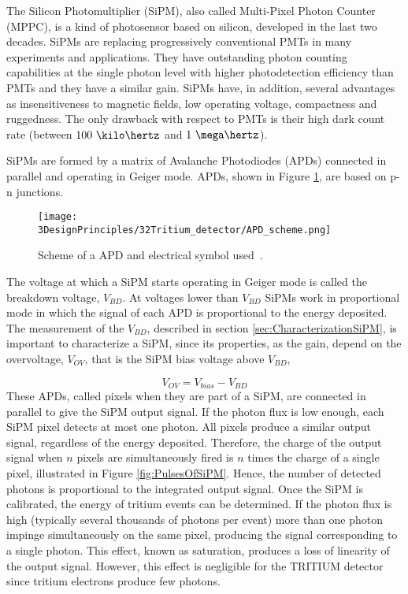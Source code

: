 The Silicon Photomultiplier (SiPM), also called Multi-Pixel Photon Counter (MPPC), is a kind of photosensor based on silicon, developed in the last two decades. SiPMs are replacing progressively conventional PMTs in many experiments and applications. They have outstanding photon counting capabilities at the single photon level with higher photodetection efficiency than PMTs and they have a similar gain. SiPMs have, in addition, several advantages as insensitiveness to magnetic fields, low operating voltage, compactness and ruggedness. The only drawback with respect to PMTs is their high dark count rate (between $100~\kilo\hertz$ and $1~\mega\hertz$).

SiPMs are formed by a matrix of Avalanche Photodiodes (APDs) connected in parallel and operating in Geiger mode. APDs, shown in Figure \ref{fig:SchemeAPD}, are based on p-n junctions. %

\begin{figure}[htbp]
\centering
\texttt{[image: 3DesignPrinciples/32Tritium\_detector/APD\_scheme.png]}
\caption{Scheme of a APD and electrical symbol used\label{fig:SchemeAPD}~\cite{OSI}.}
\end{figure}
 The voltage at which a SiPM starts operating in Geiger mode is called the breakdown voltage, $V_ {BD}$. At voltages lower than $V_ {BD}$ SiPMs work in proportional mode in which the signal of each APD is proportional to the energy deposited. The measurement of the $V_ {BD}$, described in section \ref{sec:CharacterizationSiPM}, is important to characterize a SiPM, since its properties, as the gain, depend on the overvoltage, $V_{OV}$, that is the SiPM bias voltage above $V_ {BD}$,

\begin{equation}
V_{OV}=V_{bias}-V_{BD}
\label{overvoltage}
\end{equation}
These APDs, called pixels when they are part of a SiPM, are connected in parallel to give the SiPM output signal. If the photon flux is low enough, each SiPM pixel detects at most one photon. All pixels produce a similar output signal, regardless of the energy deposited. Therefore, the charge of the output signal when $n$ pixels are simultaneously fired is $n$ times the charge of a single pixel, illustrated in Figure \ref{fig:PulsesOfSiPM}. Hence, the number of detected photons is proportional to the integrated output signal. Once the SiPM is calibrated, the energy of tritium events can be determined. If the photon flux is high (typically several thousands of photons per event) more than one photon impinge simultaneously on the same pixel, producing the signal corresponding to a single photon. This effect, known as saturation, produces a loss of linearity of the output signal. However, this effect is negligible for the TRITIUM detector since tritium electrons produce few photons. %

